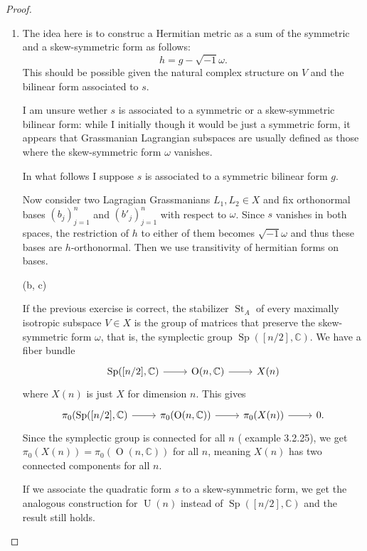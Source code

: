 \documentclass{article}
\newcommand{\C}{\mathbb{C}}
\renewcommand{\O}{\operatorname{O}}
\DeclareMathOperator{\U}{U}
\DeclareMathOperator{\Sp}{Sp}
\DeclareMathOperator{\St}{St}
\begin{document}
\begin{proof}\leavevmode
	\begin{enumerate}[label*=(\alph*)]
		\item The idea here is to construc a Hermitian metric as a sum of the symmetric and a skew-symmetric form as follows:
		\[h=g-\sqrt{-1}\omega.\]
		This should be possible given the natural complex structure on $V$ and the bilinear form associated to $s$.
		
		{\color{red}I am unsure wether $s$ is associated to a symmetric or a skew-symmetric bilinear form: while I initially though it would be just a symmetric form, it appears that Grassmanian Lagrangian subspaces are usually defined as those where the skew-symmetric form $\omega$ vanishes. 
		
		In what follows I suppose $s$ is associated to a symmetric bilinear form $g$.}
		
		Now consider two Lagragian Grassmanians $L_1,L_2\in X$ and fix orthonormal bases $(b_j)_{j=1}^n$ and $(b'_j)_{j=1}^n$ with respect to $\omega$. Since $s$ vanishes in both spaces, the restriction of $h$ to either of them becomes $\sqrt{-1}\omega$ and thus these bases are $h$-orthonormal. Then we use transitivity of hermitian forms on bases.
		\item[(b, c)] \iffalse An interesting example (\cite{hatcher}, 4.53) of a fiber bundle is $S^1\to S^{2n+1}\to\C P^n$, given by the map that sends a point to its equivalence class and, as noted in \cref{ex:3.2}, has fiber $S^1$. Surprisingly, this is the case $n=1$ for the more general fiber bundle $\U(n)\to V_n(\C^k)\to G_n(\C^k)$ where $V_n(\C^k)$ is the space of $n$-tuples of orthonormal vectors in $\C^k$ and $G_n(\C^k)$ is the space of $n$-subspaces in $\C^k$. The arrow in the right assigns to a $n$-tuple the vector space it generates, so the fiber is given by all the orthonormal $n$-tuples that generate any given linear space, which is precisely the group of $\U(n)$ by the Gram-Schmidt process.\fi
		
		If the previous exercise is correct, the stabilizer $\St_A$ of every maximally isotropic subspace $V\in X$ is the group of matrices that preserve the skew-symmetric form $\omega$, that is, the symplectic group $\Sp([n/2],\C)$. We have a fiber bundle
		\[\begin{tikzcd}
			\Sp([n/2],\C)\arrow[r]&\O(n,\C)\arrow[r]&X(n)
		\end{tikzcd}\]
		where $X(n)$ is just $X$ for dimension $n$. This gives
			\[\begin{tikzcd}[row sep=tiny]
			\pi_0(\Sp([n/2],\C)\arrow[r]&\pi_0(\O(n,\C))\arrow[r]&\pi_0(X(n))\arrow[r]&0.
		\end{tikzcd}\]
		Since the symplectic group is connected for all $n$ (\cite{piccione} example 3.2.25), we get $\pi_0(X(n))=\pi_0(\O(n,\C))$ for all $n$, meaning $X(n)$ has two connected components for all $n$.
		
		{\color{red} If we associate the quadratic form $s$ to a skew-symmetric form, we get the analogous construction for $\U(n)$ instead of $\Sp([n/2],\C)$ and the result still holds.}


	\end{enumerate}
\end{proof}

\printbibliography
\end{document}
